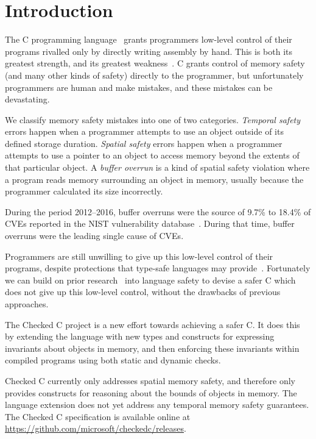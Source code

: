 \chapter{Introduction}
\label{sec:introduction}

The C programming language~\cite{Ritchie1988,ISO2011} grants
programmers low-level control of their programs rivalled only by
directly writing assembly by hand. This is both its greatest strength,
and its greatest weakness~\cite{krebbers:n1637}. C grants control of
memory safety (and many other kinds of safety) directly to the
programmer, but unfortunately programmers are human and make mistakes,
and these mistakes can be devastating.

We classify memory safety mistakes into one of two categories.
\emph{Temporal safety} errors happen when a programmer attempts to use
an object outside of its defined storage duration. \emph{Spatial
safety} errors happen when a programmer attempts to use a pointer to
an object to access memory beyond the extents of that particular
object. A \emph{buffer overrun} is a kind of spatial safety violation
where a program reads memory surrounding an object in memory, usually
because the programmer calculated its size incorrectly.

During the period 2012--2016, buffer overruns were the source of 9.7\%
to 18.4\% of CVEs reported in the NIST vulnerability
database~\cite{nvdb}. During that time, buffer overruns were the
leading single cause of CVEs.

Programmers are still unwilling to give up this low-level control of
their programs, despite protections that type-safe languages may
provide~\cite{Kell2017}. Fortunately we can build on prior
research~\cite{Jim2002,Feng2006} into language safety to devise a
safer C which does not give up this low-level control, without the
drawbacks of previous approaches.

The Checked C project is a new effort towards achieving a safer C. It
does this by extending the language with new types and constructs for
expressing invariants about objects in memory, and then enforcing
these invariants within compiled programs using both static and
dynamic checks.

Checked C currently only addresses spatial memory safety, and
therefore only provides constructs for reasoning about the bounds of
objects in memory. The language extension does not yet address any
temporal memory safety guarantees. The Checked C specification is
available online at
\url{https://github.com/microsoft/checkedc/releases}.


